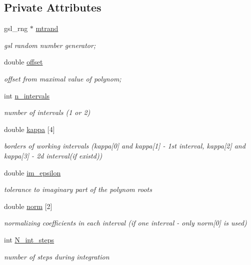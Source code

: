 \subsection*{Private Attributes}
\begin{DoxyCompactItemize}
\item 
gsl\+\_\+rng $\ast$ \hyperlink{class_p_c_a_1_1_double_well_rand_a59745c0fe851353175d8435906b7e612}{mtrand}
\begin{DoxyCompactList}\small\item\em gsl random number generator; \end{DoxyCompactList}\item 
double \hyperlink{class_p_c_a_1_1_double_well_rand_abad044e066c9b93b3eacb6d36440f650}{offset}
\begin{DoxyCompactList}\small\item\em offset from maximal value of polynom; \end{DoxyCompactList}\item 
int \hyperlink{class_p_c_a_1_1_double_well_rand_a89c48e652127b71600906d93f628dad5}{n\+\_\+intervals}
\begin{DoxyCompactList}\small\item\em number of intervals (1 or 2) \end{DoxyCompactList}\item 
double \hyperlink{class_p_c_a_1_1_double_well_rand_a4792680466fc8f865be362937b3e4e3b}{kappa} \mbox{[}4\mbox{]}
\begin{DoxyCompactList}\small\item\em borders of working intervals (kappa\mbox{[}0\mbox{]} and kappa\mbox{[}1\mbox{]} -\/ 1st interval, kappa\mbox{[}2\mbox{]} and kappa\mbox{[}3\mbox{]} -\/ 2d interval(if existd)) \end{DoxyCompactList}\item 
double \hyperlink{class_p_c_a_1_1_double_well_rand_a5fa2e0c609851d3e8a8cb9eb4bbd90c6}{im\+\_\+epsilon}
\begin{DoxyCompactList}\small\item\em tolerance to imaginary part of the polynom roots \end{DoxyCompactList}\item 
double \hyperlink{class_p_c_a_1_1_double_well_rand_aa31900946aeacdd5f462704393b93413}{norm} \mbox{[}2\mbox{]}
\begin{DoxyCompactList}\small\item\em normalizing coefficients in each interval (if one interval -\/ only norm\mbox{[}0\mbox{]} is used) \end{DoxyCompactList}\item 
int \hyperlink{class_p_c_a_1_1_double_well_rand_a935058a518ed28d62b9e2285c30382dc}{N\+\_\+int\+\_\+steps}
\begin{DoxyCompactList}\small\item\em number of steps during integration \end{DoxyCompactList}\end{DoxyCompactItemize}
